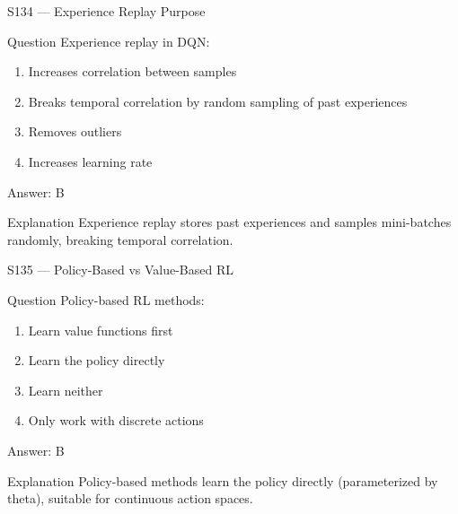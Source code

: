 \documentclass[aspectratio=169,8pt]{beamer}
\begin{document}
	\begin{frame}{S134 --- Experience Replay Purpose}
		\begin{block}{Question}
			Experience replay in DQN:
			\begin{enumerate}
				\item Increases correlation between samples
				\item Breaks temporal correlation by random sampling of past experiences
				\item Removes outliers
				\item Increases learning rate
			\end{enumerate}
		\end{block}
		\begin{exampleblock}{Answer: B}\end{exampleblock}
		\begin{block}{Explanation}
			Experience replay stores past experiences and samples mini-batches randomly, breaking temporal correlation.
		\end{block}
	\end{frame}
	
	\begin{frame}{S135 --- Policy-Based vs Value-Based RL}
		\begin{block}{Question}
			Policy-based RL methods:
			\begin{enumerate}
				\item Learn value functions first
				\item Learn the policy directly
				\item Learn neither
				\item Only work with discrete actions
			\end{enumerate}
		\end{block}
		\begin{exampleblock}{Answer: B}\end{exampleblock}
		\begin{block}{Explanation}
			Policy-based methods learn the policy directly (parameterized by theta), suitable for continuous action spaces.
		\end{block}
	\end{frame}
	
\end{document}
